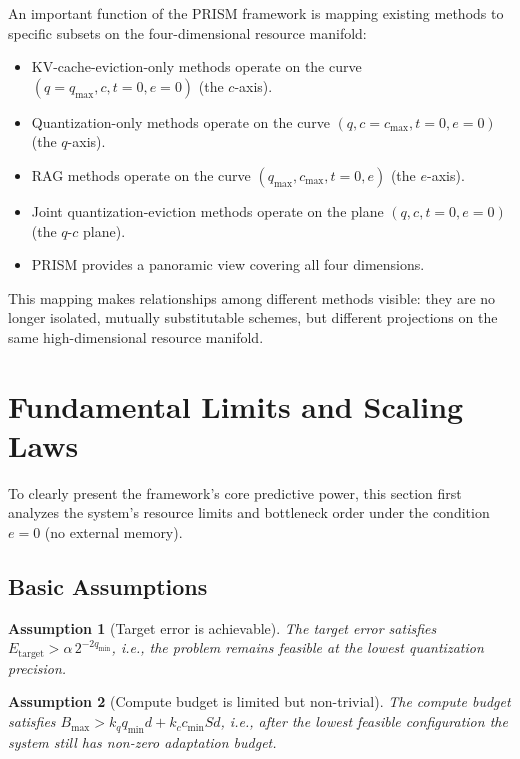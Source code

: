 \documentclass[11pt,a4paper]{article}
\theoremstyle{plain}
\newtheorem{assumption}{Assumption}
\theoremstyle{definition}
\begin{document}
An important function of the PRISM framework is mapping existing methods to specific subsets on the four-dimensional resource manifold:
\begin{itemize}
    \item KV-cache-eviction-only methods operate on the curve $(q=q_{\max}, c, t=0, e=0)$ (the $c$-axis).
    \item Quantization-only methods operate on the curve $(q, c=c_{\max}, t=0, e=0)$ (the $q$-axis).
    \item RAG methods operate on the curve $(q_{\max}, c_{\max}, t=0, e)$ (the $e$-axis).
    \item Joint quantization-eviction methods operate on the plane $(q, c, t=0, e=0)$ (the $q$-$c$ plane).
    \item PRISM provides a panoramic view covering all four dimensions.
\end{itemize}
This mapping makes relationships among different methods visible: they are no longer isolated, mutually substitutable schemes, but different projections on the same high-dimensional resource manifold.

\section{Fundamental Limits and Scaling Laws}\label{sec:limits}

To clearly present the framework's core predictive power, this section first analyzes the system's resource limits and bottleneck order under the condition $e=0$ (no external memory).

\subsection{Basic Assumptions}

\begin{assumption}[Target error is achievable]\label{asm:achievable}
The target error satisfies $E_{\text{target}} > \alpha \, 2^{-2q_{\min}}$, i.e., the problem remains feasible at the lowest quantization precision.
\end{assumption}

\begin{assumption}[Compute budget is limited but non-trivial]\label{asm:budget}
The compute budget satisfies $B_{\max} > k_q q_{\min} d + k_c c_{\min} S d$, i.e., after the lowest feasible configuration the system still has non-zero adaptation budget.
\end{assumption}
\end{document}
